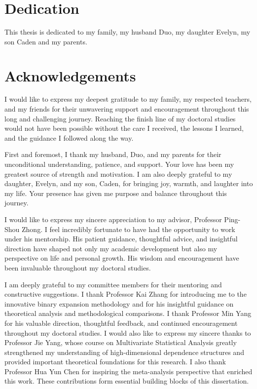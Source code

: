 \documentclass[12pt,reqno,oneside]{amsbook}
\theoremstyle{definition}
\theoremstyle{remark}
\begin{document}
\chapter*{Dedication}


This thesis is dedicated to my family, my husband Duo, my daughter Evelyn, my son Caden and my parents.

\chapter*{Acknowledgements}

I would like to express my deepest gratitude to my family, my respected teachers, and my friends for their unwavering support and encouragement throughout this long and challenging journey. Reaching the finish line of my doctoral studies would not have been possible without the care I received, the lessons I learned, and the guidance I followed along the way.

First and foremost, I thank my husband, Duo, and my parents for their unconditional understanding, patience, and support. Your love has been my greatest source of strength and motivation. I am also deeply grateful to my daughter, Evelyn, and my son, Caden, for bringing joy, warmth, and laughter into my life. Your presence has given me purpose and balance throughout this journey.

I would like to express my sincere appreciation to my advisor, Professor Ping-Shou Zhong. I feel incredibly fortunate to have had the opportunity to work under his mentorship. His patient guidance, thoughtful advice, and insightful direction have shaped not only my academic development but also my perspective on life and personal growth. His wisdom and encouragement have been invaluable throughout my doctoral studies.

I am deeply grateful to my committee members for their mentoring and constructive suggestions. I thank Professor Kai Zhang for introducing me to the innovative binary expansion methodology and for his insightful guidance on theoretical analysis and methodological comparisons. I thank Professor Min Yang for his valuable direction, thoughtful feedback, and continued encouragement throughout my doctoral studies. I would also like to express my sincere thanks to Professor Jie Yang, whose course on Multivariate Statistical Analysis greatly strengthened my understanding of high-dimensional dependence structures and provided important theoretical foundations for this research. I also thank Professor Hua Yun Chen for inspiring the meta-analysis perspective that enriched this work. These contributions form essential building blocks of this dissertation.
\end{document}
